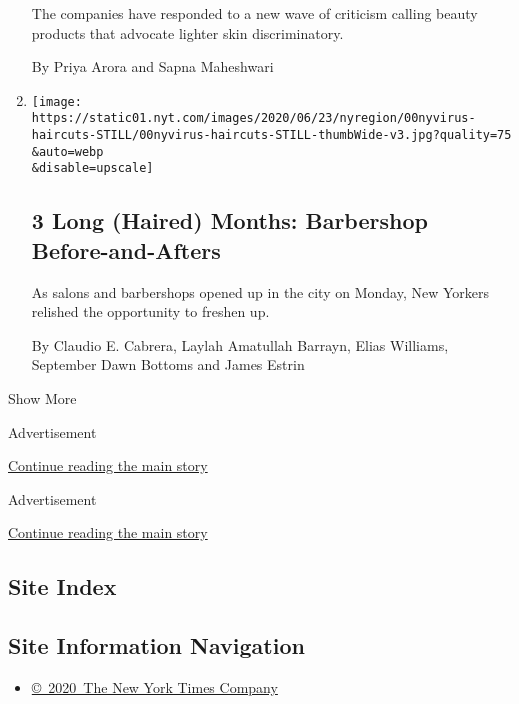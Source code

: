 \begin{enumerate}
  The companies have responded to a new wave of criticism calling beauty
  products that advocate lighter skin discriminatory.

  By Priya Arora and Sapna Maheshwari
\item
  \href{/2020/06/25/nyregion/nyc-barber-shops-coronavirus.html}{}

  \texttt{[image: https://static01.nyt.com/images/2020/06/23/nyregion/00nyvirus-haircuts-STILL/00nyvirus-haircuts-STILL-thumbWide-v3.jpg?quality=75\\\&auto=webp\\\&disable=upscale]}

  \hypertarget{3-long-haired-months-barbershop-before-and-afters}{%
  \subsection{3 Long (Haired) Months: Barbershop
  Before-and-Afters}\label{3-long-haired-months-barbershop-before-and-afters}}

  As salons and barbershops opened up in the city on Monday, New Yorkers
  relished the opportunity to freshen up.

  By Claudio E. Cabrera, Laylah Amatullah Barrayn, Elias Williams,
  September Dawn Bottoms and James Estrin
\end{enumerate}

Show More

Advertisement

\protect\hyperlink{after-mid8}{Continue reading the main story}

Advertisement

\protect\hyperlink{after-mktg}{Continue reading the main story}

\hypertarget{site-index}{%
\subsection{Site Index}\label{site-index}}

\hypertarget{site-information-navigation}{%
\subsection{Site Information
Navigation}\label{site-information-navigation}}

\begin{itemize}
\tightlist
\item
  \href{https://help.nytimes.com/hc/en-us/articles/115014792127-Copyright-notice}{©~2020~The
  New York Times Company}
\end{itemize}

